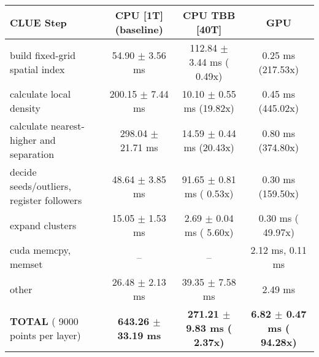     \begin{tabular}{l|c|c|c}
    \hline
    CLUE Step                                 & CPU [1T] (baseline)         & CPU TBB [40T]                         & GPU                       \\ \hline
    build fixed-grid spatial index            &  54.90 $\pm$  3.56 ms       & 112.84 $\pm$  3.44 ms ( 0.49x)        &   0.25 ms (217.53x)       \\
    calculate local density                   & 200.15 $\pm$  7.44 ms       &  10.10 $\pm$  0.55 ms (19.82x)        &   0.45 ms (445.02x)       \\
    calculate nearest-higher and separation   & 298.04 $\pm$ 21.71 ms       &  14.59 $\pm$  0.44 ms (20.43x)        &   0.80 ms (374.80x)       \\
    decide seeds/outliers, register followers &  48.64 $\pm$  3.85 ms       &  91.65 $\pm$  0.81 ms ( 0.53x)        &   0.30 ms (159.50x)       \\
    expand clusters                           &  15.05 $\pm$  1.53 ms       &   2.69 $\pm$  0.04 ms ( 5.60x)        &   0.30 ms ( 49.97x)       \\ \hline
    cuda memcpy, memset                       & --                          & --                                    &   2.12 ms,   0.11 ms      \\ 
    other                                     &  26.48 $\pm$  2.13 ms       &  39.35 $\pm$  7.58 ms                 &   2.49 ms                 \\ \hline
    \textbf{TOTAL} ( 9000 points per layer)   & \textbf{643.26 $\pm$ 33.19 ms} & \textbf{271.21 $\pm$  9.83 ms ( 2.37x)} & \textbf{  6.82 $\pm$  0.47 ms ( 94.28x)}  \\
    \hline 
    \end{tabular}
    \linebreak


